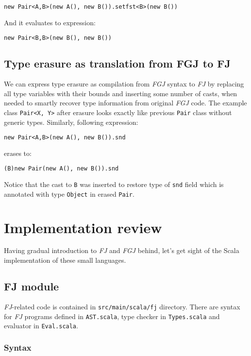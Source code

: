 \documentclass{article}[12pt]
\begin{document}
\begin{verbatim}
new Pair<A,B>(new A(), new B()).setfst<B>(new B())
\end{verbatim}
And it evaluates to expression:
\begin{verbatim}
new Pair<B,B>(new B(), new B())
\end{verbatim}

\subsection{Type erasure as translation from FGJ to FJ}

We can express type erasure as compilation from \emph{FGJ} syntax
to \emph{FJ} by replacing all type variables with their bounds
and inserting some number of casts, when needed to smartly recover
type information from original \emph{FGJ} code. The example class
\texttt{Pair<X, Y>} after erasure looks exactly like previous
\texttt{Pair} class without generic types. Similarly, following
expression:
\begin{verbatim}
new Pair<A,B>(new A(), new B()).snd
\end{verbatim}
erases to:
\begin{verbatim}
(B)new Pair(new A(), new B()).snd
\end{verbatim}
Notice that the cast to \texttt{B} was inserted to restore type
of \texttt{snd} field which is annotated with type \texttt{Object}
in erased \texttt{Pair}.

\section{Implementation review}

Having gradual introduction to \emph{FJ} and \emph{FGJ} behind,
let's get sight of the Scala implementation of these small languages.

\subsection{FJ module}

\emph{FJ}-related code is contained in \texttt{src/main/scala/fj}
directory. There are syntax for \emph{FJ} programs defined in
\texttt{AST.scala}, type checker in \texttt{Types.scala} and
evaluator in \texttt{Eval.scala}.

\subsubsection{Syntax}
\end{document}
